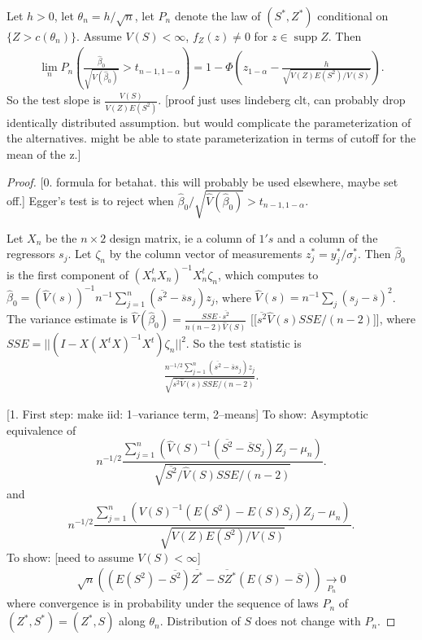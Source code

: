 \documentclass{article}
\newcommand{\E}{E}
\renewcommand{\P}{P}
\newcommand{\V}{V}
\newcommand{\mean}[1]{\overline{#1}}
\newcommand{\sel}[1]{#1^*}
\newcommand{\z}{Z}
\newcommand{\s}{S}
\DeclareMathOperator{\supp}{supp}
\begin{document}
Let $h>0$, let $\theta_n=h/\sqrt{n}$, let $\P_n$ denote the law of $(\sel S,\sel Z)$ conditional on $\{Z>c(\theta_n)\}$. Assume $\V(S)<\infty$, $f_Z(z)\neq 0$ for $z\in\supp Z$. Then
\begin{align}
  \lim_n \P_n\left(\frac{\hat{\beta}_0}{\sqrt{\V(\hat{\beta}_0)}} >
  t_{n-1,1-\alpha}\right)= 1-\Phi\left(z_{1-\alpha} -
  \frac{h}{\sqrt{\V(Z)\E(S^2)/\V(S)}}\right).
\end{align}
So the test slope is $\frac{\V(\s)}{\V(\z)\E(\s^2)}$. [proof just uses lindeberg clt, can probably drop identically distributed assumption. but would complicate the parameterization of the alternatives. might be able to state parameterization in terms of cutoff for the mean of the z.]

\begin{proof}

  [0. formula for betahat. this will probably be used elsewhere, maybe set off.]
  Egger's test is to reject when $\hat{\beta}_0/\sqrt{\hat{\V}(\hat{\beta}_0)} > t_{n-1,1-\alpha}$.
  
  Let $X_n$ be the $n\times 2$ design matrix, ie a column of $1's$ and
  a column of the regressors $s_j$. Let $\zeta_n$ by the column vector
  of measurements $\sel z_j=\sel y_j/\sel\sigma_j$. Then
  $\hat{\beta}_0$ is the first component of
  $(X_n^tX_n)^{-1}X_n^t\zeta_n$, which computes to
  $\hat{\beta}_0=(\hat{\V}(s))^{-1}n^{-1}\sum_{j=1}^n(\mean{s^2}-\mean{s}s_j)z_j$,
  where $\hat{\V}(s)=n^{-1}\sum_j(s_j-\mean{s})^2$.  The variance
  estimate is
  $\hat{\V}(\hat{\beta}_0)=\frac{SSE\cdot\mean{s^2}}{n(n-2)\hat{\V}(\s)} $ [[$\mean{s^2}\hat{\V}(s)SSE/(n-2)$]], where
  $SSE=||(I-X(X^tX)^{-1}X^t)\zeta_n||^2$. So the test statistic is 
  \begin{align}
    \frac{n^{-1/2}\sum_{j=1}^n(\mean{s^2}-\mean{s}s_j)z_j}{\sqrt{\mean{s^2}\hat{\V}(s)SSE/(n-2)}}.
  \end{align}
  
  [1. First step: make iid: 1--variance term, 2--means]
  To show: Asymptotic equivalence of
  \[
    n^{-1/2}\frac{\sum_{j=1}^n\left(\hat{\V}(\s)^{-1}(\mean{\s^2}-\mean{\s}\s_j)\z_j-\mu_n\right)}{\sqrt{\mean{\s^2}/\hat{\V}(\s)SSE/(n-2)}}.
    \]
  and
  \[
    n^{-1/2}\frac{\sum_{j=1}^n\left(\V(S)^{-1}(\E(S^2)-\E(S)S_j)Z_j-\mu_n\right)}{\sqrt{\V(Z)\E(S^2)/\V(S)}}.
  \]
  To show: [need to assume $V(S)<\infty$]
  \begin{align}
    \sqrt{n}\left(\left(\E(S^2)-\mean{S^2}\right)\mean{\sel{Z}} - \mean{S\sel{Z}}\left(\E(S)-\mean{S}\right)\right) \underset{P_n}{\to} 0
  \end{align}
  where convergence is in probability under the sequence of laws $\P_n$ of $(\sel Z,\sel S)=(\sel Z, S)$ along $\theta_n$. Distribution of $S$ does not change with $P_n$.


\end{proof}
\end{document}
